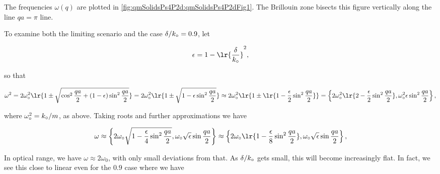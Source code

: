 {



The frequencies $\omega(q)$ are plotted in \cref{fig:qmSolidsPs4P2d:qmSolidsPs4P2dFig1}.  The Brillouin zone bisects this figure vertically along the line $q a = \pi$ line.



To examine both the limiting scenario and the case $\delta/k_\circ = 0.9$, let

\begin{dmath}\label{eqn:condensedMatterProblemSet4Problem2:740}
\epsilon = 1 - \lr{\frac{\delta}{k_\nought}}^2,
\end{dmath}

so that

\begin{dmath}\label{eqn:condensedMatterProblemSet4Problem2:760}
\omega^2 
= 2 \omega_\nought^2 \lr{ 1 \pm \sqrt{ \cos^2\frac{qa}{2} + (1 - \epsilon) \sin^2 \frac{qa}{2}} }
= 2 \omega_\nought^2 \lr{ 1 \pm \sqrt{ 1 - \epsilon \sin^2 \frac{qa}{2}} }
\approx 2 \omega_\nought^2 \lr{ 1 \pm \lr{ 1 - \frac{\epsilon}{2} \sin^2 \frac{qa}{2}} }
=
\left\{2 \omega_\nought^2 \lr{ 2 - \frac{\epsilon}{2} \sin^2 \frac{qa}{2} },
\omega_\nought^2 \epsilon \sin^2 \frac{qa}{2}
\right\},
\end{dmath}

where $\omega_\circ^2 = k_\circ/m$, as above.  Taking roots and further approximations we have

\begin{dmath}\label{eqn:condensedMatterProblemSet4Problem2:780}
\omega
\approx
\left\{2 \omega_\nought \sqrt{ 1 - \frac{\epsilon}{4} \sin^2 \frac{qa}{2} },
\omega_\nought \sqrt{\epsilon} \sin \frac{qa}{2} 
\right\}
\approx
\left\{
2 \omega_\nought \lr{ 1 - \frac{\epsilon}{8} \sin^2 \frac{qa}{2} },
\omega_\nought \sqrt{\epsilon} \sin \frac{qa}{2} 
\right\},
\end{dmath}

In optical  range, we have $\omega \approx 2 \omega_0$, with only small deviations from that.  As $\delta/k_\circ$ gets small, this will become increasingly flat.  In fact, we see this close to linear even for the $0.9$ case where we have

}
